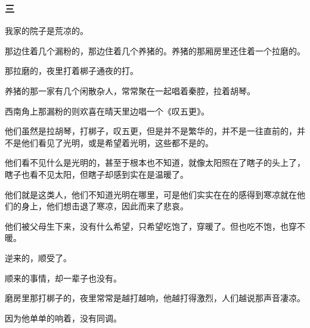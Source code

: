 \subsubsection*{三}
\par 我家的院子是荒凉的。
\par 那边住着几个漏粉的，那边住着几个养猪的。养猪的那厢房里还住着一个拉磨的。
\par 那拉磨的，夜里打着梆子通夜的打。
\par 养猪的那一家有几个闲散杂人，常常聚在一起唱着秦腔，拉着胡琴。
\par 西南角上那漏粉的则欢喜在晴天里边唱一个《叹五更》。
\par 他们虽然是拉胡琴，打梆子，叹五更，但是并不是繁华的，并不是一往直前的，并不是他们看见了光明，或是希望着光明，这些都不是的。
\par 他们看不见什么是光明的，甚至于根本也不知道，就像太阳照在了瞎子的头上了，瞎子也看不见太阳，但瞎子却感到实在是温暖了。
\par 他们就是这类人，他们不知道光明在哪里，可是他们实实在在的感得到寒凉就在他们的身上，他们想击退了寒凉，因此而来了悲哀。
\par 他们被父母生下来，没有什么希望，只希望吃饱了，穿暖了。但也吃不饱，也穿不暖。
\par 逆来的，顺受了。
\par 顺来的事情，却一辈子也没有。
\par 磨房里那打梆子的，夜里常常是越打越响，他越打得激烈，人们越说那声音凄凉。
\par 因为他单单的响着，没有同调。
